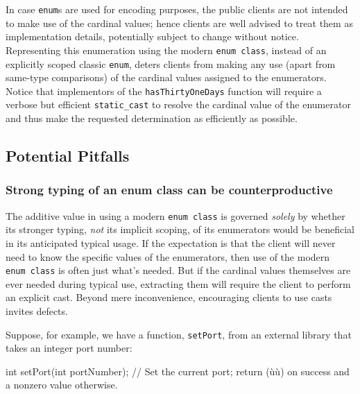 \noindent In case \texttt{enum}s are used for encoding purposes, the public clients are not intended to make use of the
cardinal values; hence clients are well advised to treat them as
implementation details, potentially subject to change without notice.
Representing this enumeration using the modern
\texttt{enum}~\texttt{class}, instead of an explicitly scoped classic
\texttt{enum}, deters clients from making any use (apart from same-type
comparisons) of the cardinal values assigned to the enumerators. Notice
that implementors of the \texttt{hasThirtyOneDays} function will require
a verbose but efficient \texttt{static\_cast} to resolve the
cardinal value of the enumerator and thus make the requested
determination as efficiently as possible.

\subsection[Potential Pitfalls]{Potential Pitfalls}\label{potential-pitfalls-enumclass}

\subsubsection[Strong typing of an {\tt enum} {\tt class} can be counterproductive]{Strong typing of an {\SubsubsecCode enum} {\SubsubsecCode class} can be counterproductive}\label{strong-typing-of-an-enum-class-can-be-counterproductive}

The additive value in using a modern \texttt{enum}~\texttt{class} is
governed \emph{solely} by whether its stronger typing, \emph{not} its
implicit scoping, of its enumerators would be beneficial in its
anticipated typical usage. If the expectation is that the client will
never need to know the specific values of the enumerators, then use
of the modern \texttt{enum}~\texttt{class} is often just what's needed.
But if the cardinal values themselves are ever needed during typical
use, extracting them will require the client to perform an explicit
cast. Beyond mere inconvenience, encouraging clients to use casts
invites defects.

Suppose, for example, we have a function, \texttt{setPort}, from an
external library that takes an integer port number:

\begin{emcppslisting}[emcppsbatch=e11]
int setPort(int portNumber);
    // Set the current port; return (ù{}ù) on success and a nonzero value otherwise.
\end{emcppslisting}

